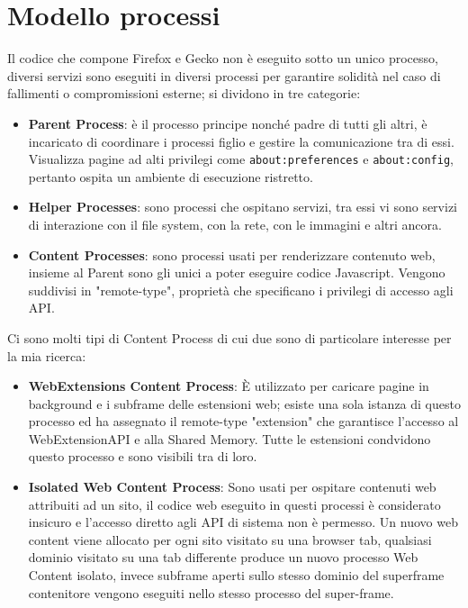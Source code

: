 \documentclass{sapthesis}
\newcommand{\code}[1]{\texttt{#1}}
\begin{document}
    \section{Modello processi}
    \label{sec:modello-processi}
        Il codice che compone Firefox e Gecko non è eseguito sotto un unico processo, diversi servizi
        sono eseguiti in diversi processi per garantire solidità nel caso di fallimenti o 
        compromissioni esterne; si dividono in tre categorie:
        \begin{itemize}
            \item \textbf{Parent Process}: è il processo principe nonché padre di tutti gli altri,
                è incaricato di coordinare i processi figlio e gestire la comunicazione tra di essi.
                Visualizza pagine ad alti privilegi come \code{about:preferences} e \code{about:config},
                pertanto ospita un ambiente di esecuzione ristretto.

            \item \textbf{Helper Processes}: sono processi che ospitano servizi, tra essi vi sono servizi
                di interazione con il file system, con la rete, con le immagini e altri ancora.

            \item \textbf{Content Processes}: sono processi usati per renderizzare contenuto web, insieme
                al Parent sono gli unici a poter eseguire codice Javascript. Vengono suddivisi in 
                "remote-type", proprietà che specificano i privilegi di accesso agli API.

        \end{itemize}
        Ci sono molti tipi di Content Process di cui due sono di particolare interesse per la mia ricerca:
        \begin{itemize}
            \item \textbf{WebExtensions Content Process}: È utilizzato per caricare pagine
                in background e i subframe delle estensioni web; esiste una sola istanza di
                questo processo ed ha assegnato il remote-type "extension" che garantisce 
                l'accesso al WebExtensionAPI e alla Shared Memory. Tutte le estensioni condvidono
                questo processo e sono visibili tra di loro.

            \item \textbf{Isolated Web Content Process}: Sono usati per ospitare contenuti web attribuiti ad un sito,
                il codice web eseguito in questi processi è considerato insicuro e l'accesso diretto agli
                API di sistema non è permesso. Un nuovo web content viene allocato per ogni sito visitato su
                una browser tab, qualsiasi dominio visitato su una tab differente produce un nuovo processo
                Web Content isolato, invece subframe aperti sullo stesso dominio del superframe contenitore
                vengono eseguiti nello stesso processo del super-frame.
        \end{itemize}
\end{document}
